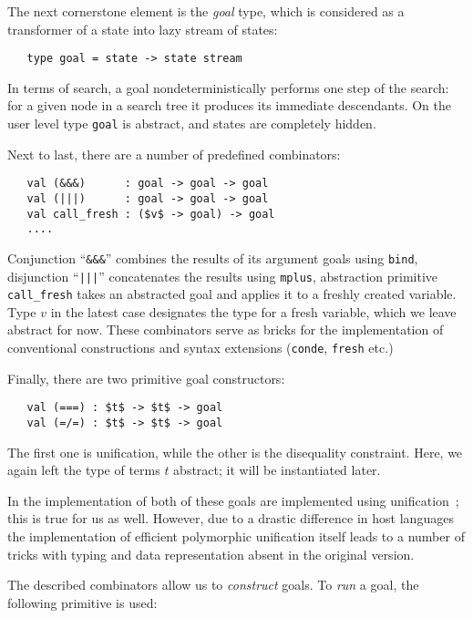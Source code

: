 The next cornerstone element is the \emph{goal} type, which is considered as a transformer of a state into
lazy stream of states:

\begin{lstlisting}
   type goal = state -> state stream
\end{lstlisting}

In terms of search, a goal nondeterministically performs one step of the search: for a given
node in a search tree it produces its immediate descendants. On the user level type \lstinline{goal}
is abstract, and states are completely hidden.

Next to last, there are a number of predefined combinators:

\begin{lstlisting}
   val (&&&)      : goal -> goal -> goal
   val (|||)      : goal -> goal -> goal
   val call_fresh : ($v$ -> goal) -> goal
   ....
\end{lstlisting}

Conjunction ``\lstinline{&&&}'' combines the results of its argument goals using \lstinline{bind},
disjunction ``\lstinline{|||}'' concatenates the results using \lstinline{mplus}, abstraction
primitive \lstinline{call_fresh} takes an abstracted goal and applies it to a freshly created
variable. Type $v$ in the latest case designates the type for a fresh variable, which we leave
abstract for now. These combinators serve as bricks for the implementation of conventional
\miniKanren constructions and syntax extensions (\lstinline{conde}, \lstinline{fresh} etc.)

Finally, there are two primitive goal constructors:

\begin{lstlisting}
   val (===) : $t$ -> $t$ -> goal
   val (=/=) : $t$ -> $t$ -> goal
\end{lstlisting}

The first one is unification, while the other is the disequality constraint. Here, we again left
the type of terms $t$ abstract; it will be instantiated later.

In the implementation of \miniKanren both of these goals are implemented using unification~\cite{CKanren}; this
is true for us as well. However, due to a drastic difference in host languages the implementation of
efficient polymorphic unification itself leads to a number of tricks with typing and data representation
absent in the original version.

The described combinators allow us to \emph{construct} goals. To \emph{run} a goal, the following
primitive is used:

